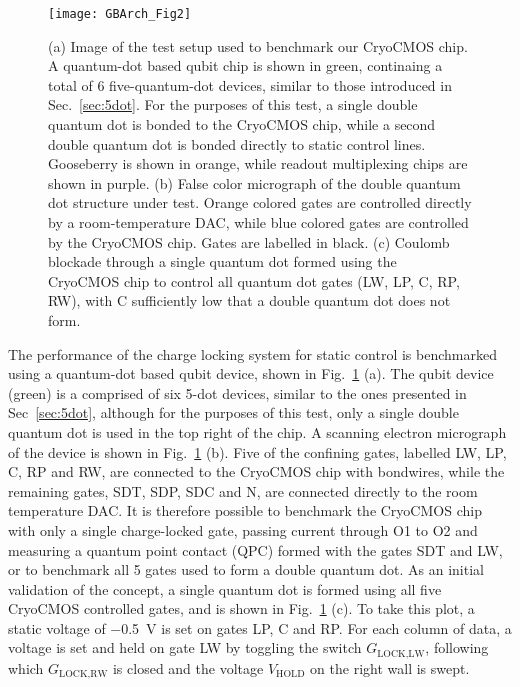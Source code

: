 \begin{figure}
  \texttt{[image: GBArch\_Fig2]}
  \caption[Testbench for the CryoCMOS Architecture]
  {\label{fig:gbtb}(a) Image of the test setup used to benchmark our CryoCMOS chip. A quantum-dot based qubit chip is shown in green, continaing a total of 6 five-quantum-dot devices, similar to those introduced in Sec.~\ref{sec:5dot}. For the purposes of this test, a single double quantum dot is bonded to the CryoCMOS chip, while a second double quantum dot is bonded directly to static control lines. Gooseberry is shown in orange, while readout multiplexing chips are shown in purple. (b) False color micrograph of the double quantum dot structure under test. Orange colored gates are controlled directly by a room-temperature DAC, while blue colored gates are controlled by the CryoCMOS chip. Gates are labelled in black. (c) Coulomb blockade through a single quantum dot formed using the CryoCMOS chip to control all quantum dot gates (LW, LP, C, RP, RW), with C sufficiently low that a double quantum dot does not form.}
\end{figure}

The performance of the charge locking system for static control is benchmarked using a quantum-dot based qubit device, shown in Fig.~\ref{fig:gbtb} (a).
The qubit device (green) is a comprised of six 5-dot devices, similar to the ones presented in Sec~\ref{sec:5dot}, although for the purposes of this test,
only a single double quantum dot is used in the top right of the chip. A scanning electron micrograph of the device is shown in Fig.~\ref{fig:gbtb} (b).
Five of the confining gates, labelled LW, LP, C, RP and RW, are connected to the CryoCMOS chip with bondwires, while the remaining gates, SDT, SDP, SDC
and N, are connected directly to the room temperature DAC. It is therefore possible to benchmark the CryoCMOS chip with only a single charge-locked gate,
passing current through O1 to O2 and measuring a quantum point contact (QPC) formed with the gates SDT and LW, or to benchmark all 5 gates used to form a
double quantum dot. As an initial validation of the concept, a single quantum dot is formed using all five CryoCMOS controlled gates, and is shown in
Fig.~\ref{fig:gbtb} (c). To take this plot, a static voltage of \SI{-0.5}{\volt} is set on gates LP, C and RP. For each column of data, a voltage is
set and held on gate LW by toggling the switch $G_\textrm{LOCK,LW}$, following which $G_\textrm{LOCK,RW}$ is closed and the voltage $V_\textrm{HOLD}$ on
the right wall is swept.

